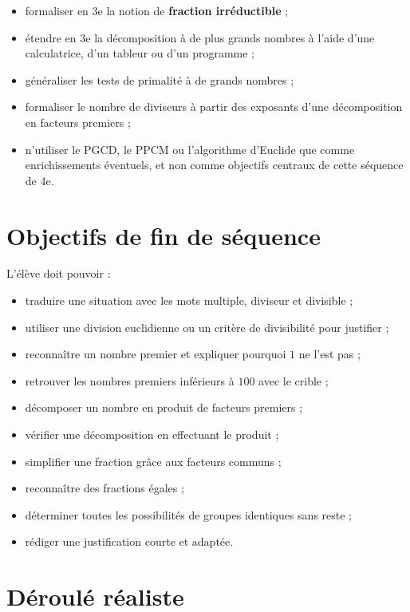 \documentclass[12pt,a4paper]{article}
\begin{document}
\begin{itemize}
  \item formaliser en 3e la notion de \textbf{fraction irréductible} ;
  \item étendre en 3e la décomposition à de plus grands nombres
        à l'aide d'une calculatrice, d'un tableur ou d'un programme ;
  \item généraliser les tests de primalité à de grands nombres ;
  \item formaliser le nombre de diviseurs à partir des exposants
        d'une décomposition en facteurs premiers ;
  \item n'utiliser le PGCD, le PPCM ou l'algorithme d'Euclide
        que comme enrichissements éventuels, et non comme objectifs centraux
        de cette séquence de 4e.
\end{itemize}

\section*{Objectifs de fin de séquence}

L'élève doit pouvoir :

\begin{itemize}
  \item traduire une situation avec les mots multiple, diviseur et divisible ;
  \item utiliser une division euclidienne ou un critère de divisibilité pour justifier ;
  \item reconnaître un nombre premier et expliquer pourquoi \(1\) ne l'est pas ;
  \item retrouver les nombres premiers inférieurs à \(100\) avec le crible ;
  \item décomposer un nombre en produit de facteurs premiers ;
  \item vérifier une décomposition en effectuant le produit ;
  \item simplifier une fraction grâce aux facteurs communs ;
  \item reconnaître des fractions égales ;
  \item déterminer toutes les possibilités de groupes identiques sans reste ;
  \item rédiger une justification courte et adaptée.
\end{itemize}

\section*{Déroulé réaliste}
\end{document}
